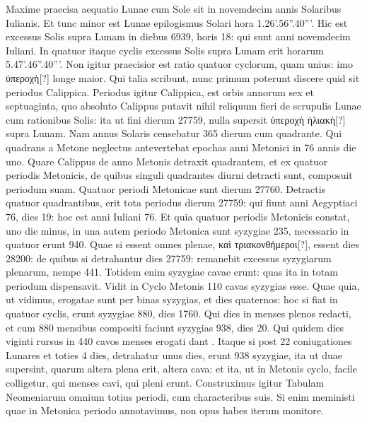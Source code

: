 Maxime
praecisa aequatio Lunae cum Sole sit in novemdecim annis Solaribus
Iulianis.
Et tunc minor est Lunae epilogismus Solari hora 1.26'.56''.40'''.
Hic est excessus Solis supra Lunam in diebus 6939, horis 18:
qui sunt anni novemdecim Iuliani.
In quatuor itaque cyclis excessus
Solis supra Lunam erit horarum 5.47'.46''.40'''.
Non igitur praecisior
est ratio quatuor cyclorum, quam unius: imo \textgreek{ὑπεροχὴ[?]} longe maior.
%
Qui talia scribunt, nunc primum poterunt discere
 quid sit periodus
Calippica.
Periodus igitur Calippica, est orbis annorum sex et septuaginta,
quo absoluto Calippus putavit nihil reliquum fieri de scrupulis
Lunae cum rationibus Solis: ita ut fini dierum 27759, nulla supersit
\textgreek{ὑπεροχὴ ἡλιακὴ[?]} supra Lunam.
Nam annus Solaris censebatur 365 dierum
cum quadrante.
Qui quadrans a Metone neglectus antevertebat
epochas anni Metonici in 76 annis die uno.
Quare Calippus de anno
Metonis detraxit quadrantem, et ex quatuor periodis Metonicis,
de quibus singuli quadrantes diurni detracti sunt, composuit periodum
suam.
Quatuor periodi Metonicae sunt dierum 27760.
Detractis
quatuor quadrantibus, erit tota periodus dierum 27759: qui
fiunt anni Aegyptiaci 76, dies 19: hoc est anni Iuliani 76.
Et quia
quatuor periodis Metonicis constat, uno die minus, in una autem periodo
Metonica sunt syzygiae 235, necessario in quatuor erunt 940.
Quae si essent omnes plenae, \textgreek{καὶ τριακονθήμεροι[?]},
 essent dies 28200: de
quibus si detrahantur dies 27759: remanebit excessus syzygiarum
plenarum, nempe 441.
Totidem enim syzygiae cavae erunt: quas ita
in totam periodum dispensavit.
Vidit in Cyclo Metonis 110 cavas
syzygias esse.
Quae quia, ut vidimus, erogatae sunt per binas syzygias,
et dies quaternos: hoc si fiat in quatuor cyclis, erunt syzygiae
880, dies 1760.
Qui dies in menses plenos redacti, et cum 880 mensibus
compositi faciunt syzygias 938, dies 20.
Qui quidem dies viginti
rursus in 440 cavos menses erogati dant .
Itaque si post 22 coniugationes
Lunares et toties 4 dies, detrahatur unus dies, erunt 938
syzygiae, ita ut duae supersint, quarum altera plena erit, altera cava: et
ita, ut in Metonis cyclo, facile colligetur, qui menses cavi, qui pleni
erunt.
Construximus igitur Tabulam Neomeniarum omnium totius
periodi, cum characteribus suis.
Si enim meministi quae in Metonica
periodo annotavimus, non opus habes iterum monitore.
